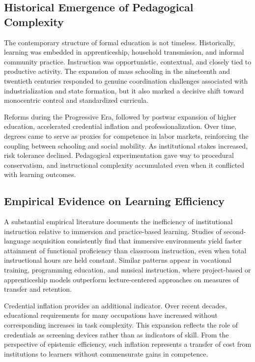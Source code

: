 \documentclass[11pt]{article}
\begin{document}
\subsection{Historical Emergence of Pedagogical Complexity}

The contemporary structure of formal education is not timeless. Historically, learning was embedded in apprenticeship, household transmission, and informal community practice. Instruction was opportunistic, contextual, and closely tied to productive activity. The expansion of mass schooling in the nineteenth and twentieth centuries responded to genuine coordination challenges associated with industrialization and state formation, but it also marked a decisive shift toward monocentric control and standardized curricula.

Reforms during the Progressive Era, followed by postwar expansion of higher education, accelerated credential inflation and professionalization. Over time, degrees came to serve as proxies for competence in labor markets, reinforcing the coupling between schooling and social mobility. As institutional stakes increased, risk tolerance declined. Pedagogical experimentation gave way to procedural conservatism, and instructional complexity accumulated even when it conflicted with learning outcomes.

\subsection{Empirical Evidence on Learning Efficiency}

A substantial empirical literature documents the inefficiency of institutional instruction relative to immersion and practice-based learning. Studies of second-language acquisition consistently find that immersive environments yield faster attainment of functional proficiency than classroom instruction, even when total instructional hours are held constant. Similar patterns appear in vocational training, programming education, and musical instruction, where project-based or apprenticeship models outperform lecture-centered approaches on measures of transfer and retention.

Credential inflation provides an additional indicator. Over recent decades, educational requirements for many occupations have increased without corresponding increases in task complexity. This expansion reflects the role of credentials as screening devices rather than as indicators of skill. From the perspective of epistemic efficiency, such inflation represents a transfer of cost from institutions to learners without commensurate gains in competence.
\end{document}

